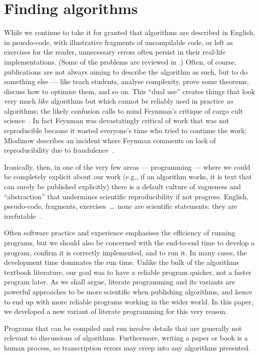 \documentclass[preprint,times]{elsarticle}
\begin{document}
\section{Finding algorithms}\label{new-approach}
While we continue to take it for granted that algorithms are described in English, in psuedo-code, with illustrative fragments of uncompilable code, or left as exercises for the reader, unnecessary errors often persist in their real-life implementations. (Some of the problems are reviewed in \cite{jmlr,heedless}.) Often, of course, publications are not always aiming to describe the algorithm as such, but to do something else --- like teach students, analyse complexity, prove some theorems, discuss how to optimise them, and so on. This ``dual use'' creates things that look very much \emph{like\/} algorithms but which cannot be reliably used in practice \emph{as\/} algorithms; the likely confusion calls to mind Feynman's critique of cargo cult science~\cite{feynman}. In fact Feynman was devastatingly critical of work that was not reproducible because it wasted everyone's time who tried to continue the work; Mlodinow describes an incident where Feynman comments on lack of reproducibility due to fraudulence~\cite{mlod}.

Ironically, then, in one of the very few areas --- programming --- where we could be completely explicit about our work (e.g., if an algorithm works, it is text that can surely be published explicitly) there is a default culture of vagueness and ``abstraction'' that undermines scientific reproducibility if not progress. English, pseudo-code, fragments, exercises~\ldots\ none are scientific statements: they are irrefutable~\cite{popper}. 

Often software practice and experience emphasises the efficiency of running programs, but we should also be concerned with the end-to-end time to develop a program, confirm it is correctly implemented, and to run it. In many cases, the development time dominates the run time. Unlike the bulk of the algorithms textbook literature, our goal was to have a reliable program quicker, not a faster program later. As we shall argue, literate programming and its variants are powerful approaches to be more scientific when publishing algorithms, and hence to end up with more reliable programs working in the wider world. In this paper, we developed a new variant of literate programming for this very reason.

Programs that can be compiled and run involve details that are generally not relevant to discussions of algorithms. Furthermore, writing a paper or book is a human process, so transcription errors may creep into any algorithms presented. 
\end{document}
